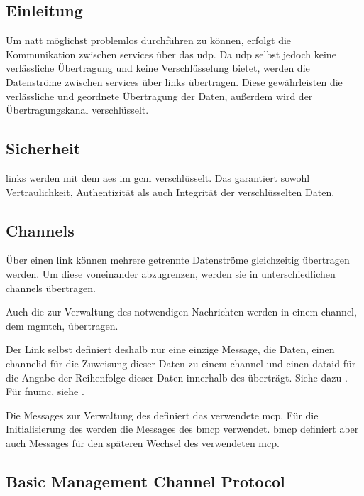 
\label{dcl-link}

\subsection{Einleitung}
Um \gls{natt} möglichst problemlos durchführen zu können, erfolgt die
Kommunikation zwischen \glspl{service} über das \gls{udp}.
Da \gls{udp} selbst jedoch keine verlässliche Übertragung und keine
Verschlüsselung bietet, werden die Datenströme zwischen \glspl{service} über
\glspl{link} übertragen.
Diese gewährleisten die verlässliche und geordnete Übertragung der Daten,
außerdem wird der Übertragungskanal verschlüsselt.

\subsection{Sicherheit}
\Glspl{link} werden mit dem \gls{aes} im \gls{gcm} verschlüsselt.
Das garantiert sowohl Vertraulichkeit, Authentizität als auch Integrität der
verschlüsselten Daten.

\subsection{Channels}
\label{dcl-link-channels}
Über einen \gls{link} können mehrere getrennte Datenströme gleichzeitig
übertragen werden. Um diese voneinander abzugrenzen, werden sie in
unterschiedlichen \glspl{channel} übertragen.

Auch die zur Verwaltung des  notwendigen Nachrichten
werden in einem \gls{channel}, dem \gls{mgmtch}, übertragen.

Der Link selbst definiert deshalb nur eine einzige Message, die Daten, einen
\gls{channelid} für die Zuweisung dieser Daten zu einem \gls{channel} und einen
\gls{dataid} für die Angabe der Reihenfolge dieser Daten innerhalb des
 überträgt.
Siehe dazu .
Für \gls{fnumc}, siehe .

\linkbytefield

Die Messages zur Verwaltung des  definiert das verwendete
\gls{mcp}.
Für die Initialisierung des  werden die Messages des
\gls{bmcp} verwendet.
\gls{bmcp} definiert aber auch Messages für den späteren Wechsel des verwendeten
\gls{mcp}.

\subsection{Basic Management Channel Protocol}
\label{dcl-link-bmcp}

